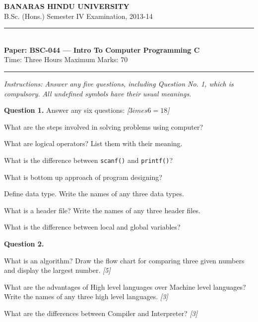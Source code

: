 \documentclass[11pt,a4paper]{article}
\newcommand{\pts}[1]{\hfill   \textit{[#1]}}
\begin{document}
\begin{center}
  {\large\bfseries BANARAS HINDU UNIVERSITY}\\[2pt]
  {\normalsize B.Sc. (Hons.) Semester IV Examination, 2013-14}\\[6pt]
  \rule{0.8\linewidth}{0.5pt}\\[6pt]
  {\large\bfseries Paper: BSC-044 --- Intro To Computer Programming C}\\[4pt]
  {\normalsize Time: Three Hours \hfill Maximum Marks: 70}
\end{center}

\rule{\linewidth}{0.4pt}

\smallskip



\noindent   \textit{Instructions: Answer any five questions, including Question No. 1, which is compulsory. All undefined symbols have their usual meanings.}

\bigskip

\medskip


\noindent   \textbf{Question 1.} Answer any six questions: \pts{$3 imes6=18$}

\begin{parts}
  \item What are the steps involved in solving problems using computer?
  \item What are logical operators? List them with their meaning.
  \item What is the difference between   \texttt{scanf()} and   \texttt{printf()}?
  \item What is bottom up approach of program designing?
  \item Define data type. Write the names of any three data types.
  \item What is a header file? Write the names of any three header files.
  \item What is the difference between local and global variables?
\end{parts}

\medskip


\noindent   \textbf{Question 2.}

\begin{parts}
  \item What is an algorithm? Draw the flow chart for comparing three given numbers and display the largest number. \pts{5}
  \item What are the advantages of High level languages over Machine level languages? Write the names of any three high level languages. \pts{3}
  \item What are the differences between Compiler and Interpreter? \pts{3}
\end{parts}
\end{document}
